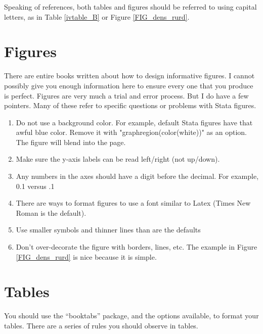 \documentclass[11pt]{article}
\begin{document}
Speaking of references, both tables and figures should be referred to using capital letters, as in Table \ref{ivtable_B} or Figure \ref{FIG_dens_rurd}. 

\section{Figures}
There are entire books written about how to design informative figures. I cannot possibly give you enough information here to ensure every one that you produce is perfect. Figures are very much a trial and error process. But I do have a few pointers. Many of these refer to specific questions or problems with Stata figures.

\begin{enumerate}
    \item Do not use a background color. For example, default Stata figures have that awful blue color. Remove it with "graphregion(color(white))" as an option. The figure will blend into the page.
    \item Make sure the y-axis labels can be read left/right (not up/down). 
    \item Any numbers in the axes should have a digit before the decimal. For example, 0.1 versus .1
    \item There are ways to format figures to use a font similar to Latex (Times New Roman is the default). 
    \item Use smaller symbols and thinner lines than are the defaults
    \item Don't over-decorate the figure with borders, lines, etc. The example in Figure \ref{FIG_dens_rurd} is nice because it is simple.
\end{enumerate}

\section{Tables}
You should use the ``booktabs'' package, and the options available, to format your tables. There are a series of rules you should observe in tables.
\end{document}
